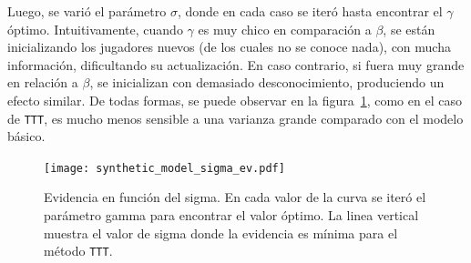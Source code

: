 \documentclass[11pt,twoside,spanish]{report} %
\begin{document}
\begin{table}[H]
\centering
{}
\caption{Tabla de valores para los par\'ametros del modelo para el caso de tres habilidades iniciales diferentes. En estos casos, $\beta$ es 1, el $\sigma$ inicial es 3 y el $\gamma$ $1e-07$.}
\label{tab:mu}
\end{table}


Luego, se vari\'o el par\'ametro $\sigma$, donde en cada caso se iter\'o hasta encontrar el $\gamma$ \'optimo.
Intuitivamente, cuando $\gamma$ es muy chico en comparaci\'on a $\beta$, se est\'an inicializando los jugadores nuevos (de los cuales no se conoce nada), con mucha informaci\'on, dificultando su actualizaci\'on.
En caso contrario, si fuera muy grande en relaci\'on a $\beta$, se inicializan con demasiado desconocimiento, produciendo un efecto similar.
De todas formas, se puede observar en la figura~\ref{fig:sigma_ev}, como en el caso de \texttt{TTT}, es mucho menos sensible a una varianza grande comparado con el modelo b\'asico.

\begin{figure}[H]
	\centering
	\texttt{[image: synthetic\_model\_sigma\_ev.pdf]}
	\caption{Evidencia en funci\'on del sigma. En cada valor de la curva se iter\'o el par\'ametro gamma para encontrar el valor \'optimo. La linea vertical muestra el valor de sigma donde la evidencia es m\'inima para el m\'etodo \texttt{TTT}.}
	\label{fig:sigma_ev}
\end{figure}
\end{document}
